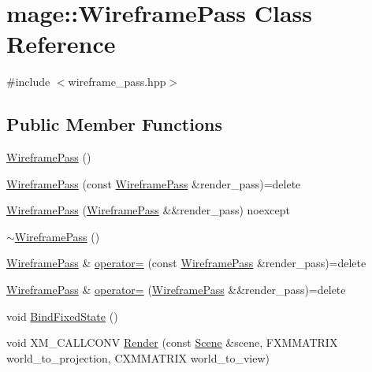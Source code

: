 \hypertarget{classmage_1_1_wireframe_pass}{}\section{mage\+:\+:Wireframe\+Pass Class Reference}
\label{classmage_1_1_wireframe_pass}


{\ttfamily \#include $<$wireframe\+\_\+pass.\+hpp$>$}

\subsection*{Public Member Functions}
\begin{DoxyCompactItemize}
\item 
\hyperlink{classmage_1_1_wireframe_pass_a7323b3caca5d06a068a89c0333651f04}{Wireframe\+Pass} ()
\item 
\hyperlink{classmage_1_1_wireframe_pass_a3e070108925c2ef3b4feaa29dbf605f2}{Wireframe\+Pass} (const \hyperlink{classmage_1_1_wireframe_pass}{Wireframe\+Pass} \&render\+\_\+pass)=delete
\item 
\hyperlink{classmage_1_1_wireframe_pass_ad6740862dc463125ba93317d0e640848}{Wireframe\+Pass} (\hyperlink{classmage_1_1_wireframe_pass}{Wireframe\+Pass} \&\&render\+\_\+pass) noexcept
\item 
\hyperlink{classmage_1_1_wireframe_pass_a186e4dd37ac17382872180385ec4dca1}{$\sim$\+Wireframe\+Pass} ()
\item 
\hyperlink{classmage_1_1_wireframe_pass}{Wireframe\+Pass} \& \hyperlink{classmage_1_1_wireframe_pass_a57da0b468c68c8653ebc639923b111ba}{operator=} (const \hyperlink{classmage_1_1_wireframe_pass}{Wireframe\+Pass} \&render\+\_\+pass)=delete
\item 
\hyperlink{classmage_1_1_wireframe_pass}{Wireframe\+Pass} \& \hyperlink{classmage_1_1_wireframe_pass_abd90640d63b9ce0c44b87de87d06910c}{operator=} (\hyperlink{classmage_1_1_wireframe_pass}{Wireframe\+Pass} \&\&render\+\_\+pass)=delete
\item 
void \hyperlink{classmage_1_1_wireframe_pass_abf99690ae099ed0ba0ca35c5d87ac0ef}{Bind\+Fixed\+State} ()
\item 
void X\+M\+\_\+\+C\+A\+L\+L\+C\+O\+NV \hyperlink{classmage_1_1_wireframe_pass_abeae5404241fd4bb29d971a97cbcc44b}{Render} (const \hyperlink{classmage_1_1_scene}{Scene} \&scene, F\+X\+M\+M\+A\+T\+R\+IX world\+\_\+to\+\_\+projection, C\+X\+M\+M\+A\+T\+R\+IX world\+\_\+to\+\_\+view)
\end{DoxyCompactItemize}
